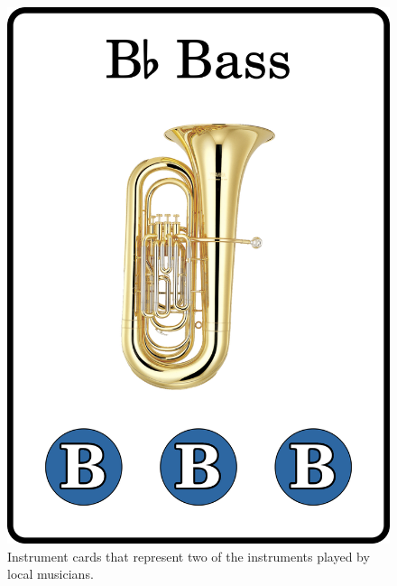 \documentclass[a6paper, 12pt, parskip=half, DIV=14]{scrartcl}
\begin{document}
\begin{figure}[h]
    \includegraphics[scale=0.065]{Images/CardImages/bass_display_front.png}
	\caption*{Instrument cards that represent two of the instruments played by local musicians.}
\end{figure}

\newpage
\enlargethispage{1.75\baselineskip}
\end{document}
